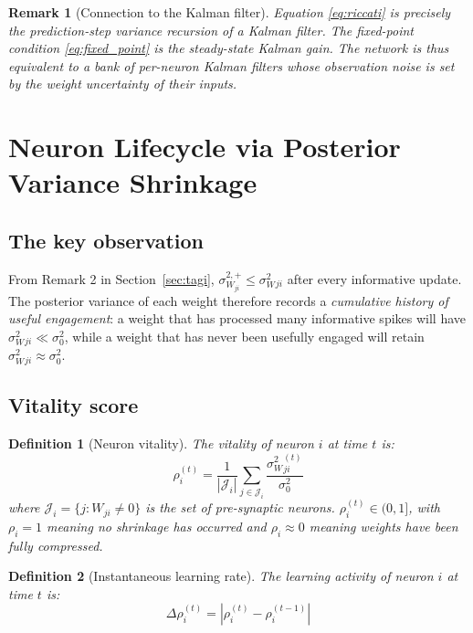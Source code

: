 \documentclass[12pt, a4paper]{article}
\newtheorem{definition}{Definition}[section]
\newtheorem{remark}{Remark}[section]
\newcommand{\sW}{\sigma^{2}_{W}}
\newcommand{\sigpost}{\sigma^{2,+}}
\begin{document}
\begin{remark}[Connection to the Kalman filter]
Equation \eqref{eq:riccati} is precisely the prediction-step variance recursion of a
Kalman filter. The fixed-point condition \eqref{eq:fixed_point} is the steady-state
Kalman gain. The network is thus equivalent to a bank of per-neuron Kalman filters whose
observation noise is set by the weight uncertainty of their inputs.
\end{remark}

\section{Neuron Lifecycle via Posterior Variance Shrinkage}
\label{sec:lifecycle}

\subsection{The key observation}

From Remark 2 in Section~\ref{sec:tagi}, $\sigpost_{W_{ji}} \leq \sW_{ji}$ after every
informative update. The posterior variance of each weight therefore records a
\emph{cumulative history of useful engagement}: a weight that has processed many
informative spikes will have $\sW_{ji} \ll \sigma^2_0$, while a weight that has never
been usefully engaged will retain $\sW_{ji} \approx \sigma^2_0$.

\subsection{Vitality score}

\begin{definition}[Neuron vitality]
The \emph{vitality} of neuron $i$ at time $t$ is:
\begin{equation}
    \rho_i^{(t)} = \frac{1}{|\mathcal{J}_i|}\sum_{j \in \mathcal{J}_i}
    \frac{\sW_{ji}^{(t)}}{\sigma^2_0}
    \label{eq:vitality}
\end{equation}
where $\mathcal{J}_i = \{j : W_{ji} \neq 0\}$ is the set of pre-synaptic neurons.
$\rho_i^{(t)} \in (0,1]$, with $\rho_i = 1$ meaning no shrinkage has occurred and
$\rho_i \approx 0$ meaning weights have been fully compressed.
\end{definition}

\begin{definition}[Instantaneous learning rate]
The \emph{learning activity} of neuron $i$ at time $t$ is:
\begin{equation}
    \Delta\rho_i^{(t)} = \left|\rho_i^{(t)} - \rho_i^{(t-1)}\right|
    \label{eq:drho}
\end{equation}
\end{definition}
\end{document}
